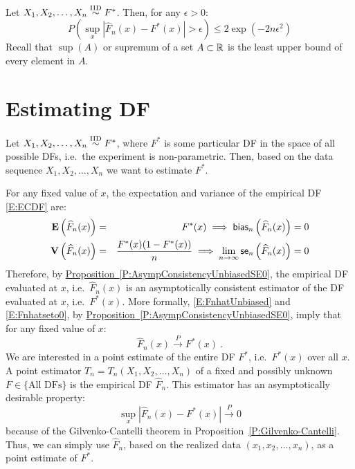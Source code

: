 \begin{prop}
Let $X_1,X_2,\ldots,X_n \overset{{\rm IID}}{\sim} F^*$.  Then, for any $\epsilon>0$:
\begin{equation}\label{E:DKWNeq}
P \left( \sup_x | \widehat{F}_n(x) - F^*(x) | > \epsilon  \right) \leq 2 \exp {(-2 n \epsilon^2)}
\end{equation}
Recall that $\sup(A)$ or supremum of a set $A \subset \mathbb{R}$ is the least upper bound of every element in $A$.
\end{prop}

\section{Estimating DF}\label{S:EstimDF}
Let $X_1,X_2,\ldots,X_n \overset{{\rm IID}}{\sim} F^*$, where $F^*$ is some particular DF in the space of all possible DFs, i.e.~the experiment is non-parametric.  Then, based on the data sequence $X_1,X_2,\ldots,X_n$ we want to estimate $F^*$.

For any fixed value of $x$, the expectation and variance of the empirical DF \eqref{E:ECDF} are:
\begin{eqnarray}
\mathbf{E} \left( \widehat{F}_n(x) \right) &=& F^*(x) \implies \mathsf{bias}_n \left( \widehat{F}_n(x) \right) = 0 \label{E:FnhatUnbiased} \\
\mathbf{V} \left( \widehat{F}_n(x) \right) &=& \frac{F^*(x) (1-F^*(x))}{n} \implies \lim_{n \to \infty}\mathsf{se}_n \left( \widehat{F}_n(x) \right) = 0  \label{E:Fnhatseto0} 
\end{eqnarray}
Therefore, by \hyperref[P:AsympConsistencyUnbiasedSE0]{Proposition~\ref* {P:AsympConsistencyUnbiasedSE0}}, the empirical DF evaluated at $x$, i.e.~$\widehat{F}_n(x)$ is an asymptotically consistent estimator of the DF evaluated at $x$, i.e.~$F^*(x)$.  More formally,
\eqref{E:FnhatUnbiased} and \eqref{E:Fnhatseto0}, by \hyperref[P:AsympConsistencyUnbiasedSE0]{Proposition~\ref* {P:AsympConsistencyUnbiasedSE0}}, imply that for any fixed value of $x$:
\[
\widehat{F}_n(x) \overset{P}{\longrightarrow} F^*(x) \ .
\]
We are interested in a point estimate of the entire DF $F^*$, i.e.~$F^*(x)$ over all $x$.  A point estimator $T_n=T_n(X_1,X_2,\ldots,X_n)$ of a fixed and possibly unknown $F \in \{ \text{All DFs} \}$ is the empirical DF $\widehat{F}_n$.  This estimator has an asymptotically desirable property: 
\[
\sup_x { | \widehat{F}_n(x) - F^*(x) | } \overset{P}{\longrightarrow} 0 
\]
because of the Gilvenko-Cantelli theorem in Proposition~\ref*{P:Gilvenko-Cantelli}.  Thus, we can simply use $\widehat{F}_n$, based on the realized data $(x_1,x_2,\ldots,x_n)$, as a point estimate of $F^*$.

